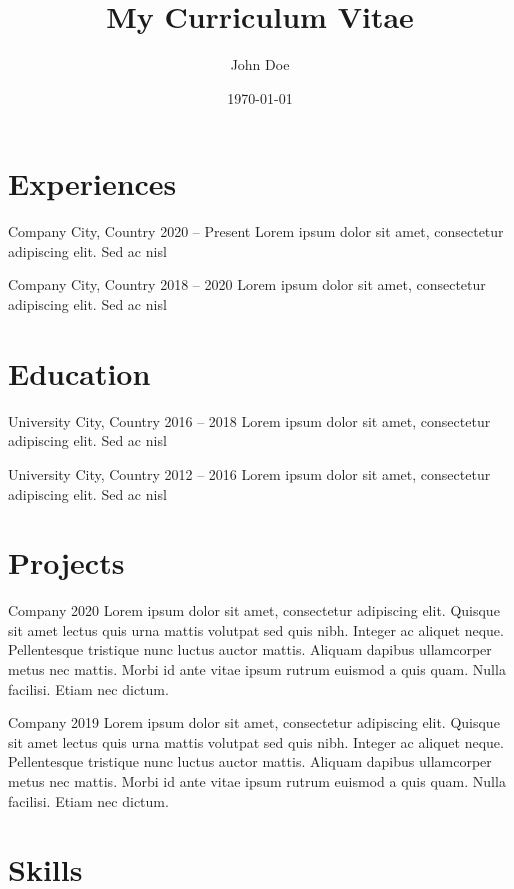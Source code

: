 \documentclass[english]{resume-template}
\title{My Curriculum Vitae}
\author{John Doe}
\date{\today}
\begin{document}
\section{Experiences}
           {Company}
           {City, Country}
           {2020 -- Present}
           {
            Lorem ipsum dolor sit amet, consectetur adipiscing elit. Sed ac nisl
           }

           {Company}
           {City, Country}
           {2018 -- 2020}
           {
            Lorem ipsum dolor sit amet, consectetur adipiscing elit. Sed ac nisl
           }

\section{Education}
           {University}
           {City, Country}
           {2016 -- 2018}
           {
            Lorem ipsum dolor sit amet, consectetur adipiscing elit. Sed ac nisl
           }

           {University}
           {City, Country}
           {2012 -- 2016}
           {
            Lorem ipsum dolor sit amet, consectetur adipiscing elit. Sed ac nisl
           }

\section{Projects}
           {Company}
           {}
           {2020}
           {
            Lorem ipsum dolor sit amet, consectetur adipiscing elit. Quisque sit amet lectus quis urna mattis volutpat sed quis nibh. Integer ac aliquet neque. Pellentesque tristique nunc luctus auctor mattis. Aliquam dapibus ullamcorper metus nec mattis. Morbi id ante vitae ipsum rutrum euismod a quis quam. Nulla facilisi. Etiam nec dictum.
           }

           {Company}
           {}
           {2019}
           {
            Lorem ipsum dolor sit amet, consectetur adipiscing elit. Quisque sit amet lectus quis urna mattis volutpat sed quis nibh. Integer ac aliquet neque. Pellentesque tristique nunc luctus auctor mattis. Aliquam dapibus ullamcorper metus nec mattis. Morbi id ante vitae ipsum rutrum euismod a quis quam. Nulla facilisi. Etiam nec dictum.
           }

\section{Skills}
\end{document}
